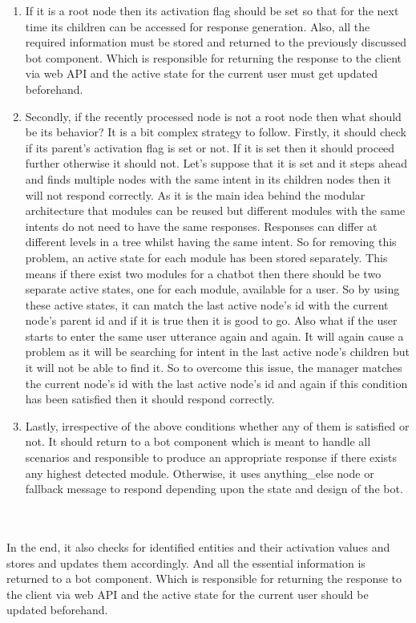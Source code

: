 \begin{enumerate}
    \item If it is a root node then its activation flag should be set so that for the next time its children can be accessed for response generation. Also, all the required information must be stored and returned to the previously discussed bot component. Which is responsible for returning the response to the client via web API and the active state for the current user must get updated beforehand. 
    \item Secondly, if the recently processed node is not a root node then what should be its behavior? It is a bit complex strategy to follow. Firstly, it should check if its parent's activation flag is set or not. If it is set then it should proceed further otherwise it should not. Let's suppose that it is set and it steps ahead and finds multiple nodes with the same intent in its children nodes then it will not respond correctly. As it is the main idea behind the modular architecture that modules can be reused but different modules with the same intents do not need to have the same responses. Responses can differ at different levels in a tree whilst having the same intent. So for removing this problem, an active state for each module has been stored separately. This means if there exist two modules for a chatbot then there should be two separate active states, one for each module, available for a user. So by using these active states, it can match the last active node's id with the current node's parent id and if it is true then it is good to go. Also what if the user starts to enter the same user utterance again and again. It will again cause a problem as it will be searching for intent in the last active node's children but it will not be able to find it. So to overcome this issue, the manager matches the current node's id with the last active node's id and again if this condition has been satisfied then it should respond correctly. 
    \item Lastly, irrespective of the above conditions whether any of them is satisfied or not. It should return to a bot component which is meant to handle all scenarios and responsible to produce an appropriate response if there exists any highest detected module. Otherwise, it uses anything\_else node or fallback message to respond depending upon the state and design of the bot.
\end{enumerate} 
\\~\\
In the end, it also checks for identified entities and their activation values and stores and updates them accordingly. And all the essential information is returned to a bot component. Which is responsible for returning the response to the client via web API and the active state for the current user should be updated beforehand.

